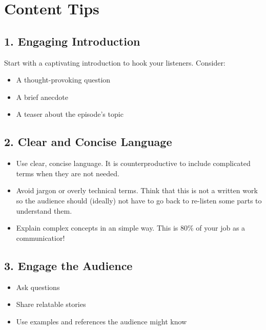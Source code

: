 \documentclass[
  letterpaper,
  DIV=11,
  numbers=noendperiod]{scrreprt}
\providecommand{\tightlist}{%
  \setlength{\itemsep}{0pt}\setlength{\parskip}{0pt}}\usepackage{longtable,booktabs,array}
\begin{document}
\section{Content Tips}\label{content-tips}

\subsection{1. Engaging Introduction}\label{engaging-introduction}

Start with a captivating introduction to hook your listeners. Consider:

\begin{itemize}
\tightlist
\item
  A thought-provoking question
\item
  A brief anecdote
\item
  A teaser about the episode's topic
\end{itemize}

\subsection{2. Clear and Concise
Language}\label{clear-and-concise-language}

\begin{itemize}
\tightlist
\item
  Use clear, concise language. It is counterproductive to include
  complicated terms when they are not needed.
\item
  Avoid jargon or overly technical terms. Think that this is not a
  written work so the audience should (ideally) not have to go back to
  re-listen some parts to understand them.
\item
  Explain complex concepts in an simple way. This is 80\% of your job as
  a communicatior!
\end{itemize}

\subsection{3. Engage the Audience}\label{engage-the-audience}

\begin{itemize}
\tightlist
\item
  Ask questions
\item
  Share relatable stories
\item
  Use examples and references the audience might know
\end{itemize}
\end{document}
